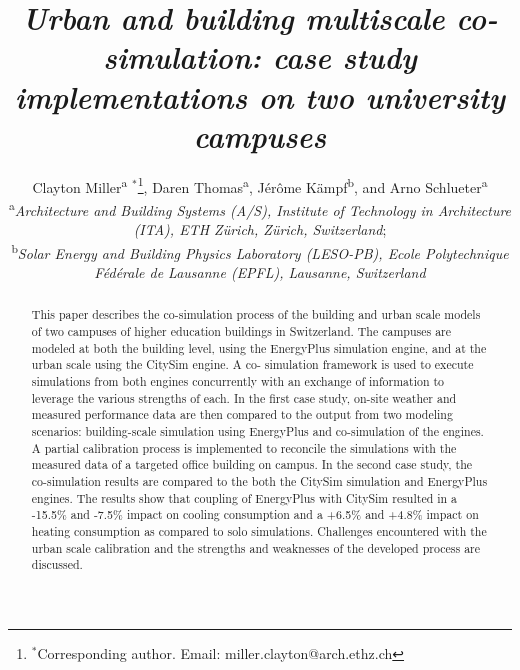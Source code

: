 \documentclass{tBPS2e}
\theoremstyle{plain}
\theoremstyle{definition}
\theoremstyle{remark}
\begin{document}


\title{\textit{Urban and building multiscale co-simulation: case study implementations on two university campuses}}

\author{Clayton Miller\textsuperscript{a}%
$^{\ast}$\thanks{$^\ast$Corresponding author. Email: miller.clayton@arch.ethz.ch}, 
Daren Thomas\textsuperscript{a},
J\'er\^ome K\"ampf\textsuperscript{b},
and Arno Schlueter\textsuperscript{a}\\
\vspace{6pt}
\textsuperscript{a}{\em Architecture and Building Systems (A/S), Institute of Technology in Architecture (ITA), ETH Z\"urich, Z\"urich, Switzerland};\\
\textsuperscript{b}{\em Solar Energy and Building Physics Laboratory (LESO-PB), Ecole Polytechnique F\'ed\'erale de Lausanne (EPFL), Lausanne, Switzerland}
}

\maketitle

\begin{abstract}
    This paper describes the co-simulation process of the building and urban
    scale models of two campuses of higher education buildings in Switzerland.
    The campuses are modeled at both the building level, using the EnergyPlus
    simulation engine, and at the urban scale using the CitySim engine. A co-
    simulation framework is used to execute simulations from both engines
    concurrently with an exchange of information to leverage the various
    strengths of each. In the first case study, on-site weather and measured
    performance data are then compared to the output from two modeling
    scenarios: building-scale simulation using EnergyPlus and co-simulation of
    the engines. A partial calibration process is implemented to reconcile the
    simulations with the measured data of a targeted office building on
    campus. In the second case study, the co-simulation results are compared
    to the both the CitySim simulation and EnergyPlus engines. The results
    show that coupling of EnergyPlus with CitySim resulted in a -15.5\% and
    -7.5\% impact on cooling consumption and a +6.5\% and +4.8\% impact on
    heating consumption as compared to solo simulations. Challenges encountered with the urban scale
    calibration and the strengths and weaknesses of the developed process are
    discussed.
\end{abstract}
\end{document}
